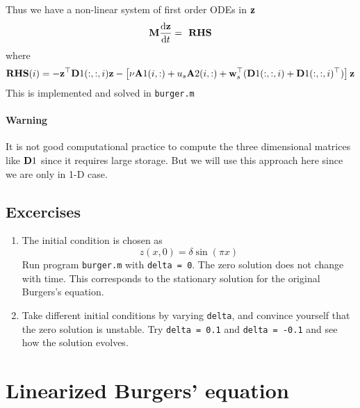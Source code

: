 \documentclass[12pt]{article}
\begin{document}
Thus we have a non-linear system of first order ODEs in ${\mathbf z}$
\begin{eqnarray*}
 {\mathbf M} \frac{\textrm{d} {\mathbf z}}{\textrm{d} t} = \textbf{ RHS} 
\end{eqnarray*}
where 
\begin{eqnarray*}
 \textbf{RHS}(i) = - {\mathbf z}^\top {\mathbf D}1(:,:,i) {\mathbf z} - \left[ \nu {\mathbf A}1(i,:) + u_s {\mathbf A}2(i,:) + {\mathbf w}_s^\top ({\mathbf D}1(:,:,i) + {\mathbf D}1(:,:,i)^\top) \right] {\mathbf z}
\end{eqnarray*}
This is implemented and solved in {\tt burger.m}

\paragraph{Warning} It is not good computational practice to compute the three dimensional matrices like ${\mathbf D}1$ since it requires large storage. But we will use this approach here since we are only in 1-D case.

\subsection{Excercises}

\begin{enumerate}

\item The initial condition is chosen as
\[
z(x,0) = \delta \sin(\pi x)
\]
Run program {\tt burger.m} with {\tt delta = 0}. The zero solution does not change with time. This corresponds to the stationary solution for the original Burgers's equation.

\item Take different initial conditions by varying {\tt delta}, and convince yourself that the zero solution is unstable. Try {\tt delta = 0.1} and {\tt delta = -0.1} and see how the solution evolves.
\end{enumerate}


\section{Linearized Burgers' equation}
\end{document}
